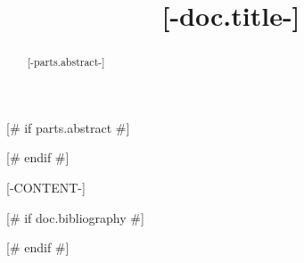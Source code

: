 \documentclass[draft]{article}
[# else #]
\begin{document}
\title{[-doc.title-]}

[# if parts.abstract #]
\begin{abstract}
[-parts.abstract-]
\end{abstract}
[# endif #]

[-CONTENT-]

[# if doc.bibliography #]

[# endif #]
\end{document}
